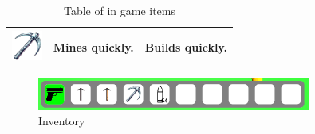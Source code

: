 \begin{table}[h]
\begin{tabular}{|c|p{5cm}|p{5cm}|}
        \hline
        \includegraphics[width=1cm]{sections/user_manual/resources/pickaxe-fast.png} & Mines quickly.                                                                        & Builds quickly.     \\
        \hline
    \end{tabular}
    \caption{Table of in game items}
    \label{tab:mytable}
\end{table}

\begin{figure}[H]
    \centering
    \includegraphics[width=0.8\textwidth]{sections/user_manual/resources/inventory.png}
    \caption{Inventory}
    \label{fig:inventory}
\end{figure}